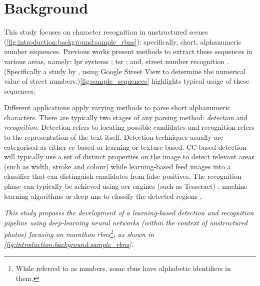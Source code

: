 \section{Background}
\label{sec:introduction:background}

This study focuses on character recognition in unstructured scenes (\cref{fig:introduction:background:sample_rbns}): specifically, short, alphanumeric number sequences. Previous works present methods to extract these sequences in various areas, namely: \gls{lpr} systems \citep{CanoPerez:2003fq,Anagnostopoulos:2006wv}; \gls{tsr} \citep{Eichner:2008dw,Kundu:2015vq,Seo:2015ez, Lian:2016dc}; and, street number recognition \citep{Netzer:2011to}. (Specifically a study by \citeauthor{Netzer:2011to}, using Google Street View to determine the numerical value of street numbers.)\cref{fig:sample_sequences} highlights typical usage of these sequences.

Different applications apply varying methods to parse short alphanumeric characters. There are typically two stages of any parsing method: \textit{detection} and \textit{recognition}. Detection refers to locating possible candidates and recognition refers to the representation of the text itself. Detection techniques usually are categorised as either \gls{cc}-based or learning or texture-based. CC-based detection will typically use a set of distinct properties on the image to detect relevant areas (such as width, stroke and colour) while learning-based feed images into a classifier that can distinguish candidates from false positives. The recognition phase can typically be achieved using \gls{ocr} engines (such as Tesseract) \citep{Benami:2012jf}, machine learning algorithms \citep{Kundu:2015vq, Netzer:2011to, Lee:1994jz} or deep \glspl{nn} to classify the detected regions \citep{Sermanet:2011ui, Lian:2016dc, Jin:2014jn}.

{
  \itshape
  This study proposes the development of a learning-based detection and recognition pipeline using deep-learning neural networks (within the context of unstructured photos) focusing on marathon \glspl{rbn}\footnote{While referred to as numbers, some \glspl{rbn} have alphabetic identifiers in them.}, as shown in \cref{fig:introduction:background:sample_rbns}.
}

